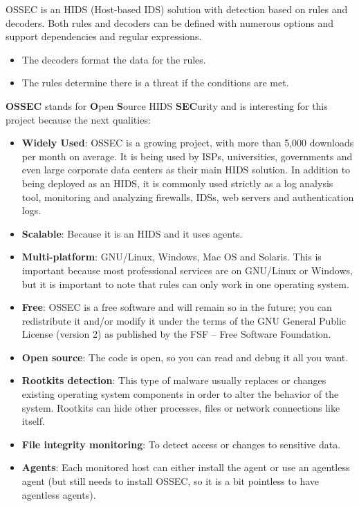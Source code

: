 \linej
\linej
OSSEC is an HIDS (Host-based IDS) solution with detection based on rules and decoders. Both rules and decoders can be defined with numerous options and support dependencies and regular expressions.
\begin{itemize}
	\item The decoders format the data for the rules.
	\item The rules determine there is a threat if the conditions are met.
\end{itemize}
\linej
\textbf{OSSEC} stands for \textbf{O}pen \textbf{S}ource HIDS \textbf{SEC}urity and is interesting for this project because the next qualities\cite{ossec}\cite{wazuh_additional_functionality}:
\begin{itemize}
	\item \textbf{Widely Used}: OSSEC is a growing project, with more than 5,000 downloads per month on average. It is being used by ISPs, universities, governments and even large corporate data centers as their main HIDS solution. In addition to being deployed as an HIDS, it is commonly used strictly as a log analysis tool, monitoring and analyzing firewalls, IDSs, web servers and authentication logs.
	\item \textbf{Scalable}: Because it is an HIDS and it uses agents.
	\item \textbf{Multi-platform}: GNU/Linux, Windows, Mac OS and Solaris. This is important because most professional services are on GNU/Linux or Windows, but it is important to note that rules can only work in one operating system.
	\item \textbf{Free}: OSSEC is a free software and will remain so in the future; you can redistribute it and/or modify it under the terms of the GNU General Public License (version 2) as published by the FSF -- Free Software Foundation.
	\item \textbf{Open source}: The code is open, so you can read and debug it all you want.
	\item \textbf{Rootkits detection}: This type of malware usually replaces or changes existing operating system components in order to alter the behavior of the system. Rootkits can hide other processes, files or network connections like itself.
	\item \textbf{File integrity monitoring}: To detect access or changes to sensitive data.
	\item \textbf{Agents}: Each monitored host can either install the agent or use an agentless agent\cite{agentless} (but still needs to install OSSEC, so it is a bit pointless to have agentless agents).
\end{itemize}
